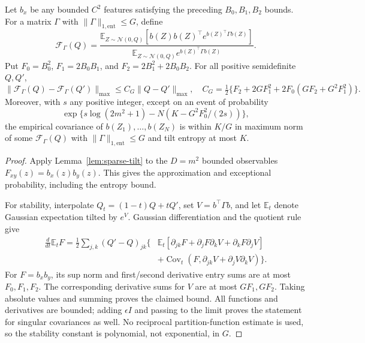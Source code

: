 \begin{lemma}
\label{lem:bulk-tilt-stability}
Let $b_x$ be any bounded $C^2$ features satisfying the preceding
$B_0,B_1,B_2$ bounds. For a matrix $\Gamma$ with
$\|\Gamma\|_{1,\mathrm{ent}}\leq G$, define
\[
 \mathcal F_\Gamma(Q)=
 \frac{\mathbb E_{Z\sim\mathcal N(0,Q)}
       [b(Z)b(Z)^\top e^{b(Z)^\top\Gamma b(Z)}]}
      {\mathbb E_{Z\sim\mathcal N(0,Q)}
                         e^{b(Z)^\top\Gamma b(Z)}}.
\]
Put $F_0=B_0^2$, $F_1=2B_0B_1$, and
$F_2=2B_1^2+2B_0B_2$. For all positive semidefinite $Q,Q'$,
\[
 \|\mathcal F_\Gamma(Q)-\mathcal F_\Gamma(Q')\|_{\max}
 \leq C_G\|Q-Q'\|_{\max},
 \quad
 C_G=\tfrac12\{F_2+2GF_1^2+2F_0(GF_2+G^2F_1^2)\}.
\]
Moreover, with $s$ any positive integer, except on an event of probability
\[
 \exp\{s\log(2m^2+1)-N(K-G^2F_0^2/(2s))\},
\]
the empirical covariance of $b(Z_1),\ldots,b(Z_N)$ is within $K/G$
in maximum norm of some $\mathcal F_\Gamma(Q)$ with
$\|\Gamma\|_{1,\mathrm{ent}}\leq G$ and tilt entropy at most $K$.
\end{lemma}
\begin{proof}
Apply Lemma~\ref{lem:sparse-tilt} to the $D=m^2$ bounded observables
$F_{xy}(z)=b_x(z)b_y(z)$. This gives the approximation and exceptional
probability, including the entropy bound.

For stability, interpolate $Q_t=(1-t)Q+tQ'$, set
$V=b^\top\Gamma b$, and let $\mathbb E_t$ denote Gaussian expectation
tilted by $e^V$. Gaussian differentiation and the quotient rule give
\begin{align*}
 \frac d{dt}\mathbb E_tF
 =\frac12\sum_{j,k}(Q'-Q)_{jk}\bigl\{
 &\mathbb E_t[\partial_{jk}F+
             \partial_jF\partial_kV+\partial_kF\partial_jV]\\
 &+\operatorname{Cov}_t(F,\partial_{jk}V+
                                   \partial_jV\partial_kV)\bigr\}.
\end{align*}
For $F=b_xb_y$, its sup norm and first/second derivative entry sums are
at most $F_0,F_1,F_2$. The corresponding derivative sums for $V$ are
at most $GF_1,GF_2$. Taking absolute values and summing proves the
claimed bound. All functions and derivatives are bounded; adding
$\epsilon I$ and passing to the limit proves the statement for singular
covariances as well. No reciprocal partition-function estimate is used,
so the stability constant is polynomial, not exponential, in $G$.
\end{proof}
